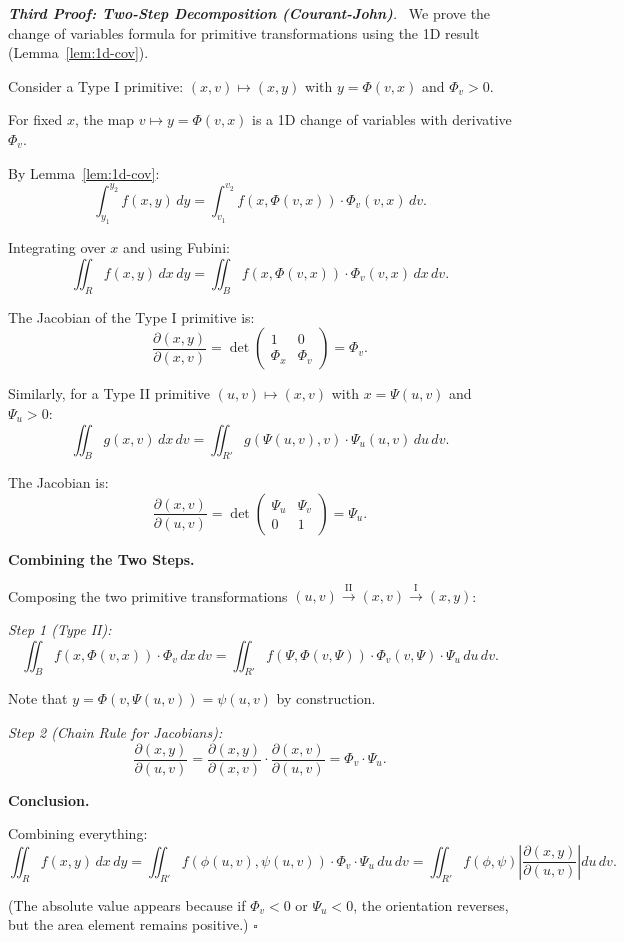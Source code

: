 \documentclass[11pt]{report}
\renewenvironment{proof}[1][Proof]{\par\noindent\textit{#1.}\ }{\hfill$\square$\par\medskip}
\begin{document}
\begin{proof}[\textbf{Third Proof: Two-Step Decomposition (Courant-John)}]
We prove the change of variables formula for primitive transformations using the 1D result (Lemma~\ref{lem:1d-cov}).

Consider a Type I primitive: $(x, v) \mapsto (x, y)$ with $y = \Phi(v, x)$ and $\Phi_v > 0$.

For fixed $x$, the map $v \mapsto y = \Phi(v, x)$ is a 1D change of variables with derivative $\Phi_v$.

By Lemma~\ref{lem:1d-cov}:
\[
\int_{y_1}^{y_2} f(x, y) \, dy = \int_{v_1}^{v_2} f(x, \Phi(v, x)) \cdot \Phi_v(v, x) \, dv.
\]

Integrating over $x$ and using Fubini:
\[
\iint_R f(x, y) \, dx \, dy = \iint_B f(x, \Phi(v, x)) \cdot \Phi_v(v, x) \, dx \, dv.
\]

The Jacobian of the Type I primitive is:
\[
\frac{\partial(x, y)}{\partial(x, v)} = \det \begin{pmatrix} 1 & 0 \\ \Phi_x & \Phi_v \end{pmatrix} = \Phi_v.
\]

Similarly, for a Type II primitive $(u, v) \mapsto (x, v)$ with $x = \Psi(u, v)$ and $\Psi_u > 0$:
\[
\iint_B g(x, v) \, dx \, dv = \iint_{R'} g(\Psi(u, v), v) \cdot \Psi_u(u, v) \, du \, dv.
\]

The Jacobian is:
\[
\frac{\partial(x, v)}{\partial(u, v)} = \det \begin{pmatrix} \Psi_u & \Psi_v \\ 0 & 1 \end{pmatrix} = \Psi_u.
\]

\textbf{Combining the Two Steps.}

Composing the two primitive transformations $(u, v) \xrightarrow{\text{II}} (x, v) \xrightarrow{\text{I}} (x, y)$:

\textit{Step 1 (Type II):}
\[
\iint_B f(x, \Phi(v, x)) \cdot \Phi_v \, dx \, dv = \iint_{R'} f(\Psi, \Phi(v, \Psi)) \cdot \Phi_v(v, \Psi) \cdot \Psi_u \, du \, dv.
\]

Note that $y = \Phi(v, \Psi(u, v)) = \psi(u, v)$ by construction.

\textit{Step 2 (Chain Rule for Jacobians):}
\[
\frac{\partial(x, y)}{\partial(u, v)} = \frac{\partial(x, y)}{\partial(x, v)} \cdot \frac{\partial(x, v)}{\partial(u, v)} = \Phi_v \cdot \Psi_u.
\]

\textbf{Conclusion.}

Combining everything:
\[
\iint_R f(x, y) \, dx \, dy = \iint_{R'} f(\phi(u, v), \psi(u, v)) \cdot \Phi_v \cdot \Psi_u \, du \, dv = \iint_{R'} f(\phi, \psi) \left| \frac{\partial(x, y)}{\partial(u, v)} \right| du \, dv.
\]

(The absolute value appears because if $\Phi_v < 0$ or $\Psi_u < 0$, the orientation reverses, but the area element remains positive.)
\end{proof}
\end{document}
